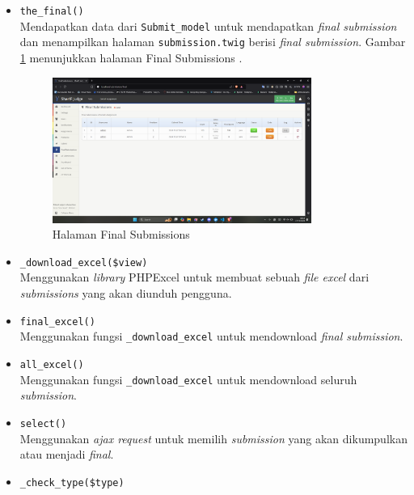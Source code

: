 \documentclass[a4paper,twoside]{article}
\begin{document}
\begin{enumerate}
\begin{itemize}
\begin{itemize}
			                  \begin{itemize}
				                  \item \verb|the_final()| \\
				                        Mendapatkan data dari \verb|Submit_model| untuk mendapatkan \textit{final submission} dan menampilkan halaman \verb|submission.twig| berisi \textit{final submission}. Gambar \ref{fig:3:1:1:final} menunjukkan halaman Final Submissions .
				                        \begin{figure}[H]
					                        \centering
					                        \includegraphics[width=0.8\textwidth]{views/final_submissions.png}
					                        \caption{Halaman Final Submissions}
					                        \label{fig:3:1:1:final}
				                        \end{figure}
				                  \item \verb|_download_excel($view)| \\
				                        Menggunakan \textit{library} PHPExcel untuk membuat sebuah \textit{file excel} dari \textit{submissions} yang akan diunduh pengguna.
				                  \item \verb|final_excel()| \\
				                        Menggunakan fungsi \verb|_download_excel| untuk mendownload \textit{final submission}.
				                  \item \verb|all_excel()| \\
				                        Menggunakan fungsi \verb|_download_excel| untuk mendownload seluruh \textit{submission}.
				                  \item \verb|select()| \\
				                        Menggunakan \textit{ajax request} untuk memilih \textit{submission} yang akan dikumpulkan atau menjadi \textit{final}.
				                  \item \verb|_check_type($type)| \\

\end{itemize}
\end{itemize}
\end{itemize}
\end{enumerate}
\end{document}
